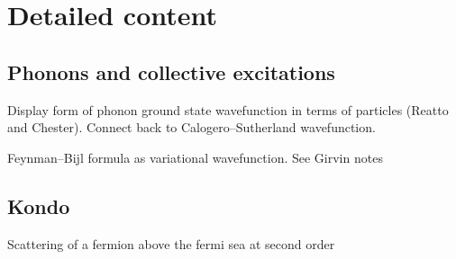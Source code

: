 \section{Detailed content}

\subsection{Phonons and collective excitations}

Display form of phonon ground state wavefunction in terms of particles (Reatto and Chester). Connect back to Calogero--Sutherland wavefunction. 

Feynman--Bijl formula as variational wavefunction. See Girvin notes

\subsection{Kondo}

Scattering of a fermion above the fermi sea at second order

